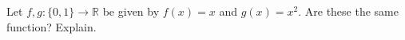 Let $f,g:\{0,1\}\to\mathbb R$ be given by $f(x)=x$ and $g(x)=x^2$. Are these the same function? Explain.
